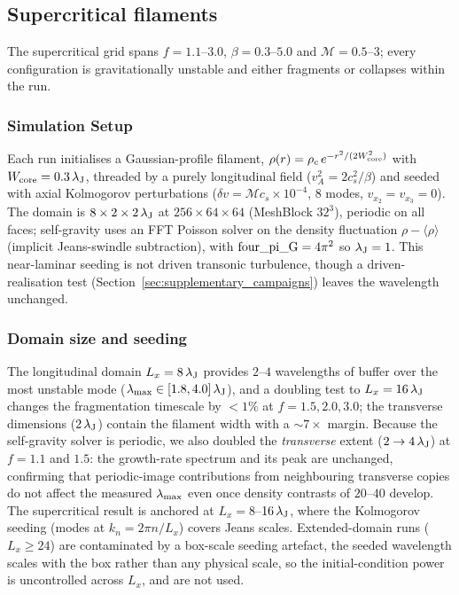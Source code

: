 \documentclass[usenatbib,twoside,twocolumn]{mnras}
\begin{document}
\subsection{Supercritical filaments}
\label{sec:supercrit}

The supercritical grid spans $f=1.1$--$3.0$, $\beta=0.3$--$5.0$ and $\mathcal{M}=0.5$--$3$; every configuration is gravitationally unstable and either fragments or collapses within the run.

\subsubsection{Simulation Setup}

Each run initialises a Gaussian-profile filament, $\rho(r)=\rho_c\,e^{-r^2/(2W_{\rm core}^2)}$ with $W_{\rm core}=0.3\,\lambda_{\rm J}$, threaded by a purely longitudinal field ($v_A^2=2c_s^2/\beta$) and seeded with axial Kolmogorov perturbations ($\delta v=\mathcal{M}c_s\times10^{-4}$, 8 modes, $v_{x_2}=v_{x_3}=0$). The domain is $8\times2\times2\,\lambda_{\rm J}$ at $256\times64\times64$ (MeshBlock $32^3$), periodic on all faces; self-gravity uses an FFT Poisson solver on the density fluctuation $\rho-\langle\rho\rangle$ (implicit Jeans-swindle subtraction), with ${\rm four\_pi\_G}=4\pi^2$ so $\lambda_{\rm J}=1$. This near-laminar seeding is not driven transonic turbulence, though a driven-realisation test (Section~\ref{sec:supplementary_campaigns}) leaves the wavelength unchanged.

\subsubsection{Domain size and seeding}

The longitudinal domain $L_x=8\,\lambda_{\rm J}$ provides $2$--$4$ wavelengths of buffer over the most unstable mode ($\lambda_{\rm max}\in[1.8,4.0]\,\lambda_{\rm J}$), and a doubling test to $L_x=16\,\lambda_{\rm J}$ changes the fragmentation timescale by $<1\%$ at $f=1.5,2.0,3.0$; the transverse dimensions ($2\,\lambda_{\rm J}$) contain the filament width with a $\sim7\times$ margin. Because the self-gravity solver is periodic, we also doubled the \emph{transverse} extent ($2\to4\,\lambda_{\rm J}$) at $f=1.1$ and $1.5$: the growth-rate spectrum and its peak are unchanged, confirming that periodic-image contributions from neighbouring transverse copies do not affect the measured $\lambda_{\rm max}$ even once density contrasts of $20$--$40$ develop. The supercritical result is anchored at $L_x=8$--$16\,\lambda_{\rm J}$, where the Kolmogorov seeding (modes at $k_n=2\pi n/L_x$) covers Jeans scales. Extended-domain runs ($L_x\geq24$) are contaminated by a box-scale seeding artefact, the seeded wavelength scales with the box rather than any physical scale, so the initial-condition power is uncontrolled across $L_x$, and are not used.
\end{document}
